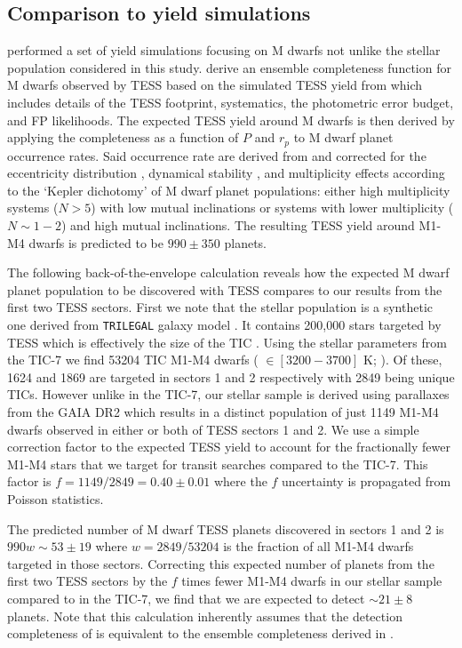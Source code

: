 \subsection{Comparison to yield simulations}
\cite{ballard18} performed a set of yield simulations focusing on M dwarfs not unlike the
stellar population considered in this study. \cite{ballard18} derive an ensemble completeness
function for M dwarfs observed by TESS based on the simulated TESS yield
from \cite{sullivan15} which includes details of the TESS footprint, systematics, the
photometric error budget, and FP likelihoods. The expected TESS yield around M dwarfs is
then derived by applying the completeness as a function of $P$ and $r_p$ to M dwarf planet
occurrence rates. Said occurrence rate are
derived from \cite{dressing15a} and corrected for the eccentricity
distribution \citep{limbach15}, dynamical stability \citep{fabrycky12}, and multiplicity
effects according to the `Kepler dichotomy' \citep{ballard16} of M dwarf planet populations:
either high multiplicity systems ($N>5$) with low mutual inclinations or systems with lower
multiplicity ($N\sim 1-2$) and high mutual inclinations. The resulting TESS yield
around M1-M4 dwarfs is predicted to be $990 \pm 350$ planets. 

The following back-of-the-envelope calculation reveals how the expected
M dwarf planet population to be discovered with TESS compares to our \pipeline{} results
from the first two TESS sectors. First we note
that the \cite{sullivan15} stellar population is a synthetic one derived from \texttt{TRILEGAL}
galaxy model \citep{girardi05}. It contains 200,000 stars targeted by TESS which is
effectively the size of the TIC \citep{stassun17}. Using the stellar parameters from the TIC-7
we find 53204 TIC M1-M4 dwarfs (\teff{} $\in [3200-3700]$ K; \citealt{pecaut13}).
Of these, 1624 and 1869 are targeted in sectors 1 and 2 respectively with 2849
being unique TICs. However unlike in the TIC-7,
our stellar sample is derived using parallaxes from the GAIA DR2 which results in
a distinct population of just 1149 M1-M4 dwarfs observed in either or both of TESS sectors 1
and 2. We use a simple correction factor to the expected TESS yield to account for the
fractionally fewer M1-M4 stars that we target for transit searches compared to the TIC-7.
This factor is $f=1149/2849 = 0.40 \pm 0.01$ where the $f$ uncertainty
is propagated from Poisson statistics. 

The predicted number of M dwarf TESS planets discovered in sectors 1 and 2 is
$990w \sim 53 \pm 19$ where $w=2849/53204$ is the fraction of all M1-M4 dwarfs targeted in
those sectors. Correcting this expected number of planets from the first two TESS sectors
by the $f$ times fewer M1-M4 dwarfs in our stellar sample compared to in the TIC-7,
we find that we are expected to detect
$\sim 21 \pm 8$ planets. Note that this calculation inherently assumes that the detection
completeness of \pipeline{} is equivalent to the ensemble completeness derived in \cite{ballard18}. 

